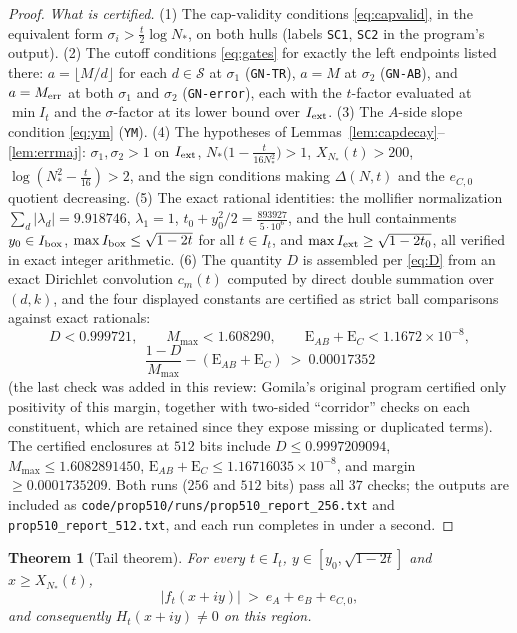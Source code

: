 \documentclass[11pt]{article}
\newtheorem{theorem}{Theorem}[section]
\theoremstyle{definition}
\newcommand{\calS}{\mathcal{S}}
\begin{document}
\begin{proof}
\emph{What is certified.} (1) The cap-validity conditions
\eqref{eq:capvalid}, in the equivalent form
$\sigma_i>\frac t2\log N_*$, on both hulls (labels \texttt{SC1},
\texttt{SC2} in the program's output). (2) The cutoff conditions
\eqref{eq:gates} for exactly the left endpoints listed there:
$a=\lfloor M/d\rfloor$ for each $d\in\calS$ at $\sigma_1$
(\texttt{GN-TR}), $a=M$ at $\sigma_2$ (\texttt{GN-AB}), and
$a=M_{\rm err}$ at both $\sigma_1$ and $\sigma_2$
(\texttt{GN-error}), each with the $t$-factor evaluated at
$\min I_t$ and the $\sigma$-factor at its lower bound over
$I_{\rm ext}$. (3) The $A$-side slope condition \eqref{eq:ym}
(\texttt{YM}). (4) The hypotheses of
Lemmas~\ref{lem:capdecay}--\ref{lem:errmaj}: $\sigma_1,\sigma_2>1$
on $I_{\rm ext}$, $N_*\bigl(1-\frac t{16N_*^2}\bigr)>1$,
$X_{N_*}(t)>200$, $\log(N_*^2-\frac t{16})>2$, and the sign
conditions making $\Delta(N,t)$ and the $e_{C,0}$ quotient
decreasing. (5) The exact rational identities: the mollifier
normalization $\sum_d|\lambda_d|=9.918746$, $\lambda_1=1$,
$t_0+y_0^2/2=\frac{893927}{5\cdot10^6}$, and the hull containments
$y_0\in I_{\rm box}$,
$\max I_{\rm box}\le\sqrt{1-2t}$ for all $t\in I_t$, and
$\max I_{\rm ext}\ge\sqrt{1-2t_0}$, all verified in exact integer
arithmetic. (6) The quantity $D$ is assembled per \eqref{eq:D}
from an exact Dirichlet convolution $c_m(t)$ computed by direct
double summation over $(d,k)$, and the four displayed constants
are certified as strict ball comparisons against exact rationals:
\[
D<0.999721,\qquad M_{\max}<1.608290,\qquad
\mathrm{E}_{AB}+\mathrm{E}_{C}<1.1672\times10^{-8},
\]
\[
\frac{1-D}{M_{\max}}-(\mathrm{E}_{AB}+\mathrm{E}_{C})
\ >\ 0.00017352
\]
(the last check was added in this review: Gomila's original program
certified only positivity of this margin, together with two-sided
``corridor'' checks on each constituent, which are retained since
they expose missing or duplicated terms). The certified enclosures
at $512$ bits include
$D\le0.9997209094$, $M_{\max}\le1.6082891450$,
$\mathrm{E}_{AB}+\mathrm{E}_{C}\le1.16716035\times10^{-8}$, and
margin $\ge0.0001735209$. Both runs ($256$ and $512$ bits) pass all
$37$ checks; the outputs are included as
\texttt{code/prop510/runs/prop510\_report\_256.txt}
and \texttt{prop510\_report\_512.txt}, and each run completes in
under a second.
\end{proof}

\begin{theorem}[Tail theorem]\label{thm:tail}
For every $t\in I_t$, $y\in[y_0,\sqrt{1-2t}]$ and
$x\ge X_{N_*}(t)$,
\[
|f_t(x+iy)|\ >\ e_A+e_B+e_{C,0},
\]
and consequently $H_t(x+iy)\ne0$ on this region.
\end{theorem}
\end{document}
